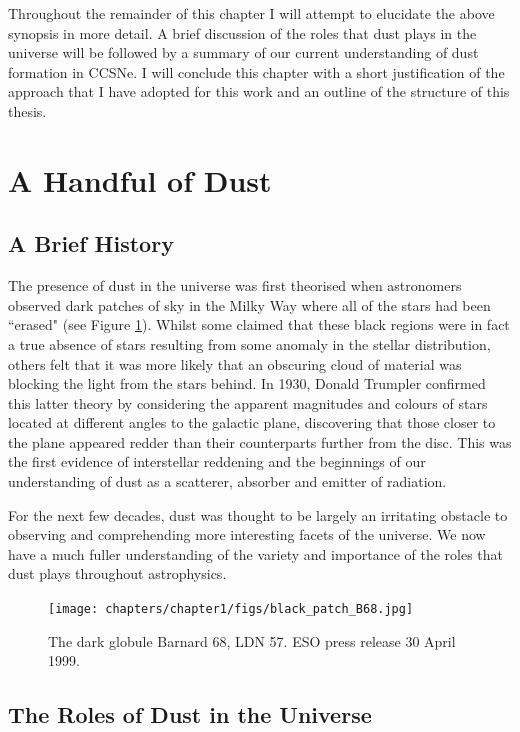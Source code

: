 Throughout the remainder of this chapter I will attempt to elucidate the above synopsis in more detail.  A brief discussion of the roles that dust plays in the universe will be followed by a summary of our current understanding of dust formation in CCSNe.  I will conclude this chapter with a short justification of the approach that I have adopted for this work and an outline of the structure of this thesis.


\section{A Handful of Dust}


\subsection{A Brief History}

The presence of dust in the universe was first theorised when astronomers observed dark patches of sky in the Milky Way where all of the stars had been ``erased" (see Figure \ref{intro:fig:dustpatch}).  Whilst some claimed that these black regions were in fact a true absence of stars resulting from some anomaly in the stellar distribution, others felt that it was more likely that an obscuring cloud of material was blocking the light from the stars behind.  In 1930, Donald Trumpler confirmed this latter theory by considering the apparent magnitudes and colours of stars located at different angles to the galactic plane, discovering that those closer to the plane appeared redder than their counterparts further from the disc.  This was the first evidence of interstellar reddening and the beginnings of our understanding of dust as a scatterer, absorber and emitter of radiation.

For the next few decades, dust was thought to be largely an irritating obstacle to observing and comprehending more interesting facets of the universe.  We now have a much fuller understanding of the variety and importance of the roles that dust plays throughout astrophysics.

\begin{figure}
\centering
\texttt{[image: chapters/chapter1/figs/black\_patch\_B68.jpg]}
\caption{The dark globule Barnard 68, LDN 57.  ESO press release 30 April 1999.}
\label{intro:fig:dustpatch}
\end{figure}

\subsection{The Roles of Dust in the Universe}

